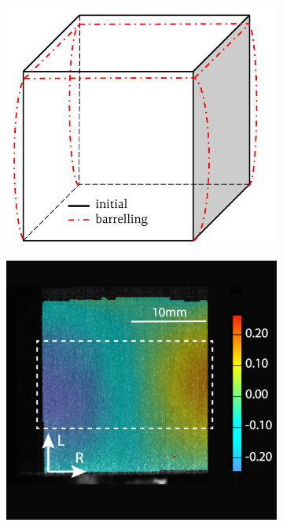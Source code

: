 \documentclass[review]{elsarticle}
\begin{document}
\begin{figure}
    \centering
    \begin{subfigure}[b]{0.4\textwidth}
        \centering
        \includegraphics[width=\textwidth]{BarellingEffectZoomed.pdf}
        \caption{}
        \label{fig:barrelling}
    \end{subfigure}
    \hfill
    \begin{subfigure}[b]{0.4\textwidth}
        \centering
        \includegraphics[width=\textwidth]{experiment.png}

\end{subfigure}
\end{figure}
\end{document}
